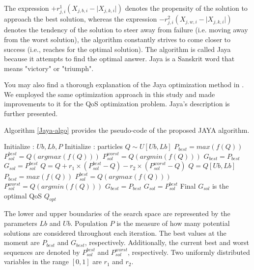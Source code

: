 \documentclass[3p,twocolumn]{elsarticle}
\theoremstyle{thmstyleone}%
\theoremstyle{thmstyletwo}%
\theoremstyle{thmstylethree}%
\begin{document}
The expression \(+ r^1_{j, i} (X_{j,b, i}- \lvert X_{j,k, i} \rvert)\) denotes the propensity of the solution to approach the best solution, whereas the expression \(- r^2_{j, i} (X_{j,w, i} -  \lvert X_{j,k, i} \rvert)\) denotes the tendency of the solution to steer away from failure (i.e. moving away from the worst solution), the algorithm constantly strives to come closer to success (i.e., reaches for the optimal solution). The algorithm is called Jaya because it attempts to find the optimal answer. Jaya is a Sanskrit word that means "victory" or "triumph".

You may also find a thorough explanation of the Jaya optimization method in \cite{rao2016jaya}. We employed the same optimization approach in this study and made improvements to it for the QoS optimization problem. Jaya's description is further presented.

Algorithm \ref{Jaya-algo} provides the pseudo-code of the proposed JAYA algorithm.

\begin{algorithm}
	\caption{Jaya Optimization Algorithm}
	\label{Jaya-algo}
	\begin{algorithmic}[1]
		\newline
		Initialize : \(Ub,Lb,P\) 
		\newline
		Initialize : particles \(Q \sim U[Ub,Lb]\) 
		\newline
		\(P_{best}=max(f(Q))\) 
		\newline
		\(P_{sol}^{best}=Q(arg max(f(Q)))\) 
		\newline
		\(P_{sol}^{worst}=Q(arg min(f(Q)))\) 
		\newline
		\(G_{best}=P_{best}\) 
		\newline
		\(G_{sol}=P_{sol}^{best}\) 				
		\State  \(Q= Q + r_1 \times (P_{sol}^{best}-Q) - r_2 \times  (P_{sol}^{worst}-Q)\)  
		\State \(Q= {Q} [Ub,Lb]\) 
		\State \(P_{best}=max(f(Q))\) 
		\State \(P_{sol}^{best}=Q(arg max(f(Q)))\) 
		\State \(P_{sol}^{worst}=Q(arg min(f(Q)))\) 
		\State \(G_{best}=P_{best}\) 
		\State \(G_{sol}=P_{sol}^{best}\) 
		\EndIf
		\EndWhile
		\newline
		Final \(G_{sol}\) is the optimal QoS \(Q_{opt}\)
		\EndProcedure
	\end{algorithmic}
\end{algorithm}


The lower and upper boundaries of the search space are represented by the parameters \(Lb\) and \(Ub\). Population \(P\) is the measure of how many potential solutions are considered throughout each iteration. The best values at the moment are \(P_{best}\) and \(G_{best}\), respectively. Additionally, the current best and worst sequences are denoted by \(P_{sol}^{best}\) and \(P_{sol}^{worst}\), respectively. Two uniformly distributed variables in the range $[0, 1]$ are \(r_1\) and \(r_2\).
\end{document}
